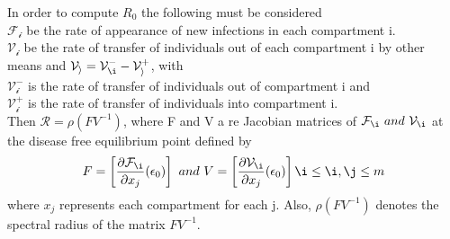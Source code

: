 \documentclass[a4paper,12pt]{report}
\numberwithin{equation}{section}
\begin{document}
In order to compute \textit{$R_0$} the following must be considered \\
$\mathcal{F_i}$ be the rate of appearance of new infections in each compartment i.\\
$\mathcal{V_i}$ be the rate of transfer of individuals out of each compartment i by other means and $\mathcal{V_i} = \mathcal{V_{\i}^{-}} - \mathcal{V_{i}^{+}}$, with \\
$\mathcal{V_{i}^{-}}$ is the rate of transfer of individuals out of compartment i and \\
$\mathcal{V_{i}^{+}}$ is the rate of transfer of individuals into compartment i. \\
Then $\mathcal{R} =\rho \left( FV^{-1} \right) $, where F and V a re Jacobian matrices of $\mathcal{F_{\i}} \ and \ \mathcal{V_{\i}}$ at the disease free equilibrium point defined by 
\begin{equation*}
F = \left[ \frac{\partial \mathcal{F_{\i}}}{\partial x_{j}}(\epsilon _{0}) \right]\ and \ V = \left[ \frac{\partial \mathcal{V_{\i}}}{\partial x_{j}}(\epsilon _{0}) \right] \i \leq \i,\j\leq m
\end{equation*} 
where $x_{j}$ represents each compartment for each j. Also, $\rho (FV^{-1})$ denotes the spectral radius of the matrix $FV^{-1}$.
\end{document}
